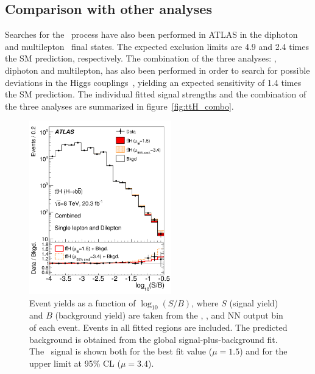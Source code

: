 \subsection{Comparison with other analyses}
Searches for the \ttH\ process have also been performed in ATLAS in the diphoton~\cite{Aad:2014lma} and multilepton~\cite{ATLAS-CONF-2015-006} final states. 
The expected exclusion limits are 4.9 and 2.4 times the SM prediction, respectively.
The combination of the three analyses: \bbbar, diphoton and multilepton, has also been performed in order to search for possible deviations in the Higgs couplings~\cite{ATLAS-CONF-2015-007}, yielding an expected sensitivity of 1.4 times the SM prediction.
The individual fitted signal strengths and the combination of the three analyses are summarized in figure~\ref{fig:ttH_combo}.
\begin{figure}[!tpb]
\begin{center}
\includegraphics[trim=0cm 0.4cm 0cm 0.8cm, clip=true, width=0.55\textwidth]{Analysis/Figures_ttH/SBplot_postfit.pdf}
\caption{Event yields as a function of $\log_{10}(S/B)$, where $S$ 
(signal yield) and $B$ (background yield) are taken from the \hthad, 
\htlep, and NN output bin of each event.  Events in all fitted regions are included. 
The predicted background is obtained from the global signal-plus-background fit.  
The \tth\ signal is shown both for the best fit value ($\mu = 1.5$) and for the upper limit at 95\% CL ($\mu=3.4$).}
\label{fig:logSBplot}
\end{center}
\vspace{-1.2cm}
\end{figure}
